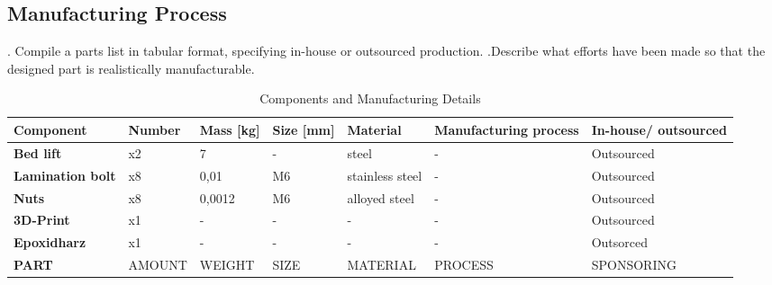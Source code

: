 \subsection{Manufacturing Process}
.  Compile a parts list in tabular format, specifying in-house or outsourced production.
.Describe what efforts have been made so that the designed part is realistically manufacturable.
\begin{table}[ht]
\centering

\label{table:components}
\begin{adjustbox}{width=\textwidth,center}
\begin{tabular}{|>{\bfseries}m{2.5cm}|m{1.4cm}|m{1.7cm}|m{2.1cm}|m{2.2cm}|m{2.6cm}|m{2.2cm}|}
\hline
Component & Number & Mass [kg] & Size [mm] & Material & Manufacturing process & In-house/ outsourced \\
\hline
Bed lift & x2 & 7 & - & steel & - & Outsourced \\
Lamination bolt & x8 & 0,01 & M6 & stainless steel & - & Outsourced \\
Nuts & x8 & 0,0012 & M6 & alloyed steel & - & Outsourced \\
3D-Print & x1 & - & - & - & - & Outsourced \\
Epoxidharz & x1 & - & - & - & -& Outsorced \\
PART & AMOUNT & WEIGHT & SIZE & MATERIAL & PROCESS & SPONSORING \\
\hline

\end{tabular}
\end{adjustbox}
\caption{Components and Manufacturing Details}
\end{table}

\par %

